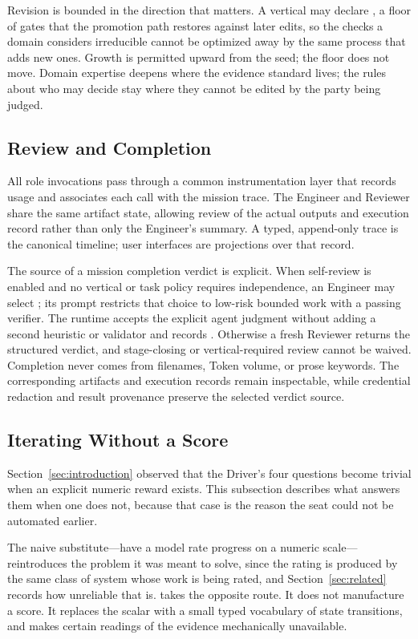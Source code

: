 Revision is bounded in the direction that matters. A vertical may declare
, a floor of gates that the promotion path restores
against later edits, so the checks a domain considers irreducible cannot be
optimized away by the same process that adds new ones. Growth is permitted upward
from the seed; the floor does not move. Domain expertise deepens where the evidence standard
lives; the rules about who may decide stay where they cannot be edited by the party
being judged.

\subsection{Review and Completion}

All role invocations pass through a common instrumentation layer that records usage
and associates each call with the mission trace. The Engineer and Reviewer share
the same artifact state, allowing review of the actual outputs and execution record
rather than only the Engineer's summary. A typed, append-only trace is the canonical
timeline; user interfaces are projections over that record.

The source of a mission completion verdict is explicit. When self-review is enabled
and no vertical or task policy requires independence, an Engineer may select
; its prompt restricts that choice to low-risk bounded work with
a passing verifier. The runtime accepts the explicit agent judgment without adding
a second heuristic or validator and records
. Otherwise a fresh Reviewer
returns the structured verdict, and stage-closing or vertical-required review cannot
be waived. Completion never comes from filenames, Token volume, or prose keywords.
The corresponding artifacts and execution records remain inspectable, while
credential redaction and result provenance preserve the selected verdict source.

\subsection{Iterating Without a Score}
\label{sec:no-score}

Section~\ref{sec:introduction} observed that the Driver's four questions become
trivial when an explicit numeric reward exists. This subsection describes what answers them when
one does not, because that case is the reason the seat could not be automated
earlier.

The naive substitute---have a model rate progress on a numeric scale---reintroduces
the problem it was meant to solve, since the rating is produced by the same class of
system whose work is being rated, and Section~\ref{sec:related} records how
unreliable that is. \systemname{} takes the opposite route. It does not manufacture a
score. It replaces the scalar with a small typed vocabulary of state transitions, and
makes certain readings of the evidence mechanically unavailable.

